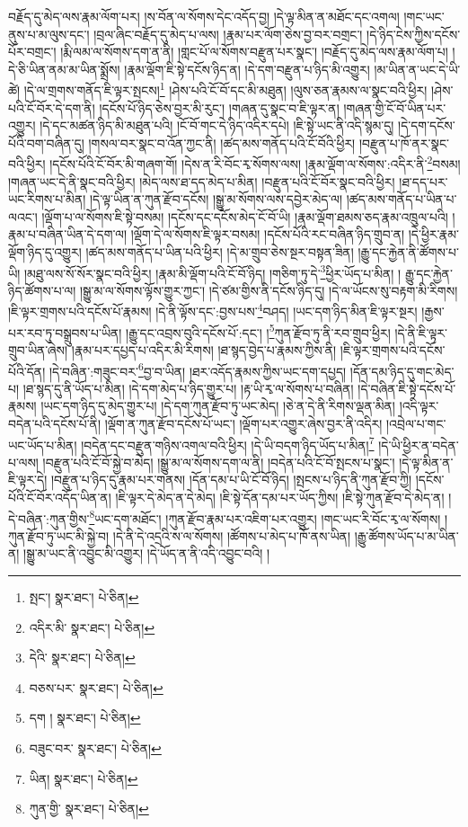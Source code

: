 བརྗོད་དུ་མེད་ལས་རྣམ་ལོག་པར། །ས་བོན་ལ་སོགས་དེང་འདོད་བྱ། །དེ་ལྟ་མིན་ན་མཐོང་དང་འགལ། །གང་ཡང་ནུས་པ་མ་ལུས་དང་། །བྲལ་ཞིང་བརྗོད་དུ་མེད་པ་ལས། །རྣམ་པར་ལོག་ཅེས་བྱ་བར་བགྲང་། །དེ་ཉིད་ངེས་ཀྱིས་དངོས་པོར་བགྲང་། །རྨི་ལམ་ལ་སོགས་དག་ན་ནི། །གླང་པོ་ལ་སོགས་བརྫུན་པར་སྣང་། །བརྗོད་དུ་མེད་ལས་རྣམ་ལོག་པ། །དེ་ཅི་ཡིན་ནམ་མ་ཡིན་སྨྲོས། །རྣམ་ལྡོག་ཇི་སྟེ་དངོས་ཉིད་ན། །དེ་དག་བརྫུན་པ་ཉིད་མི་འགྱུར། །མ་ཡིན་ན་ཡང་དེ་ཡི་ཚེ། །དེ་ལ་གྲགས་གནོད་ཇི་ལྟར་སྤངས།\footnote{སྤང་།  སྣར་ཐང་།  པེ་ཅིན། } །ཤེས་པའི་ངོ་བོ་དང་མི་མཐུན། །ལུས་ཅན་རྣམས་ལ་སྣང་བའི་ཕྱིར། །ཤེས་པའི་ངོ་བོར་དེ་དག་ནི། །དངོས་པོ་ཉིད་ཅེས་བྱར་མི་རུང་། །གཞན་དུ་སྣང་བ་ཇི་ལྟར་ན། །གཞན་གྱི་ངོ་བོ་ཡིན་པར་འགྱུར། །དེ་དང་མཚན་ཉིད་མི་མཐུན་པའི། །ངོ་བོ་གང་དེ་ཉིད་འདིར་དཔེ། །ཇི་སྟེ་ཡང་ནི་འདི་སྙམ་དུ། །དེ་དག་དངོས་པོའི་བག་བཞིན་དུ། །གསལ་བར་སྣང་བ་འོན་ཀྱང་ནི། །ཚད་མས་གནོད་པའི་ངོ་བོའི་ཕྱིར། །བརྫུན་པ་ཁོ་ནར་སྣང་བའི་ཕྱིར། །དངོས་པོའི་ངོ་བོར་མི་གཞག་གོ། །དེས་ན་རི་བོང་རྭ་སོགས་ལས། །རྣམ་ལྡོག་ལ་སོགས་:འདིར་ནི་\footnote{འདིར་མི་  སྣར་ཐང་།  པེ་ཅིན། }བསམ། །གཞན་ཡང་དེ་ནི་སྣང་བའི་ཕྱིར། །མེད་ལས་ཐ་དད་མེད་པ་མིན། །བརྫུན་པའི་ངོ་བོར་སྣང་བའི་ཕྱིར། །ཐ་དད་པར་ཡང་རིགས་པ་མིན། །དེ་ལྟ་ཡིན་ན་ཀུན་རྫོབ་དངོས། །སྒྱུ་མ་སོགས་ལས་དབྱེར་མེད་ལ། །ཚད་མས་གནོད་པ་ཡིན་པ་ལའང་། །ལྡོག་པ་ལ་སོགས་ཇི་སྟེ་བསམ། །དངོས་དང་དངོས་མེད་ངོ་བོ་ཡི། །རྣམ་ལྡོག་ཐམས་ཅད་རྣམ་འཁྲུལ་པའི། །རྣམ་པ་བཞིན་ཡིན་དེ་དག་ལ། །ལྡོག་དེ་ལ་སོགས་ཇི་ལྟར་བསམ། །དངོས་པོའི་རང་བཞིན་ཉིད་གྲུབ་ན། །དེ་ཕྱིར་རྣམ་ལྡོག་ཉིད་དུ་འགྱུར། །ཚད་མས་གནོད་པ་ཡིན་པའི་ཕྱིར། །དེ་མ་གྲུབ་ཅེས་སྔར་བསྟན་ཟིན། །རྒྱུ་དང་རྐྱེན་ནི་ཚོགས་པ་ཡི། །མཐུ་ལས་སོ་སོར་སྣང་བའི་ཕྱིར། །རྣམ་མི་ལྡོག་པའི་ངོ་བོ་ཉིད། །གཅིག་ཏུ་དེ་\footnote{དེའི་  སྣར་ཐང་།  པེ་ཅིན། }ཕྱིར་ཡོད་པ་མིན། །
རྒྱུ་དང་རྐྱེན་ཉིད་ཚོགས་པ་ལ། །སྒྱུ་མ་ལ་སོགས་ལྟོས་གྱུར་ཀྱང་། །དེ་ཙམ་གྱིས་ནི་དངོས་ཉིད་དུ། །དེ་ལ་ཡོངས་སུ་བརྟག་མི་རིགས། །ཇི་ལྟར་གྲགས་པའི་དངོས་པོ་རྣམས། །དེ་ནི་ལྟོས་དང་:བྱས་པས་\footnote{བཅས་པར་  སྣར་ཐང་།  པེ་ཅིན། }བཤད། །ཡང་དག་ཉིད་མིན་ཇི་ལྟར་སྔར། །རྒྱས་པར་རབ་ཏུ་བསྒྲུབས་པ་ཡིན། །རྒྱུ་དང་འབྲས་བུའི་དངོས་པོ་:དང་། །\footnote{དག །  སྣར་ཐང་།  པེ་ཅིན། }ཀུན་རྫོབ་ཏུ་ནི་རབ་གྲུབ་ཕྱིར། །དེ་ནི་ཇི་ལྟར་གྲུབ་ཡིན་ཞེས། །རྣམ་པར་དཔྱད་པ་འདིར་མི་རིགས། །ཐ་སྙད་བྱེད་པ་རྣམས་ཀྱིས་ནི། །ཇི་ལྟར་གྲགས་པའི་དངོས་པོའི་དོན། །དེ་བཞིན་:གཟུང་བར་\footnote{བཟུང་བར་  སྣར་ཐང་།  པེ་ཅིན། }བྱ་བ་ཡིན། །ཐར་འདོད་རྣམས་ཀྱིས་ཡང་དག་དཔྱད། །དོན་དམ་ཉིད་དུ་གང་མེད་པ། །ཐ་སྙད་དུ་ནི་ཡོད་པ་མིན། །དེ་དག་མེད་པ་ཉིད་གྱུར་པ། །རྟ་ཡི་རྭ་ལ་སོགས་པ་བཞིན། །དེ་བཞིན་ཇི་སྟེ་དངོས་པོ་རྣམས། །ཡང་དག་ཉིད་དུ་མེད་གྱུར་པ། །དེ་དག་ཀུན་རྫོབ་ཏུ་ཡང་མེད། །ཅེ་ན་དེ་ནི་རིགས་ལྡན་མིན། །འདི་ལྟར་བདེན་པའི་དངོས་པོ་ནི། །ལྡོག་ན་ཀུན་རྫོབ་དངོས་པོ་ཡང་། །ལྡོག་པར་འགྱུར་ཞེས་བྱར་ནི་འདིར། །འབྲེལ་པ་གང་ཡང་ཡོད་པ་མིན། །བདེན་དང་བརྫུན་གཉིས་འགལ་བའི་ཕྱིར། །དེ་ཡི་བདག་ཉིད་ཡོད་པ་མིན།\footnote{ཡིན།  སྣར་ཐང་།  པེ་ཅིན། } །དེ་ཡི་ཕྱིར་ན་བདེན་པ་ལས། །བརྫུན་པའི་ངོ་བོ་སྐྱེ་བ་མེད། །སྒྱུ་མ་ལ་སོགས་དག་ལ་ནི། །བདེན་པའི་ངོ་བོ་སྤངས་པ་སྣང་། །དེ་ལྟ་མིན་ན་ཇི་ལྟར་དེ། །བརྫུན་པ་ཉིད་དུ་རྣམ་པར་གནས། །དོན་དམ་པ་ཡི་ངོ་བོ་ཉིད། །སྤངས་པ་ཉིད་ནི་ཀུན་རྫོབ་ཀྱི། །དངོས་པོའི་ངོ་བོར་འདོད་ཡིན་ན། །ཇི་ལྟར་དེ་མེད་ན་དེ་མེད། །ཇི་སྟེ་དོན་དམ་པར་ཡོད་ཀྱིས། །ཇི་སྟེ་ཀུན་རྫོབ་དེ་མེད་ན། །དེ་བཞིན་:ཀུན་གྱིས་\footnote{ཀུན་གྱི་  སྣར་ཐང་།  པེ་ཅིན། }ཡང་དག་མཐོང་། །ཀུན་རྫོབ་རྣམ་པར་འཇིག་པར་འགྱུར། །གང་ཡང་རི་བོང་རྭ་ལ་སོགས། །ཀུན་རྫོབ་ཏུ་ཡང་མི་སྐྱེ་བ། །དེ་ནི་དེ་འདྲའི་ས་ལ་སོགས། །ཚོགས་པ་མེད་པ་ཁོ་ནས་ཡིན། །རྒྱུ་ཚོགས་ཡོད་པ་མ་ཡིན་ན། །སྒྱུ་མ་ཡང་ནི་འབྱུང་མི་འགྱུར། །དེ་ཡོད་ན་ནི་འདི་འབྱུང་བའི། །
